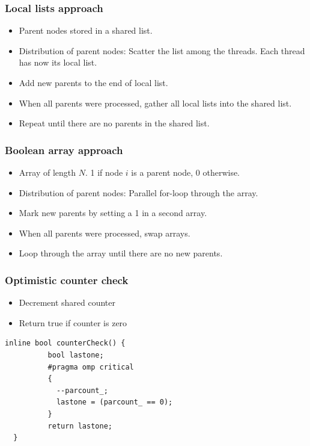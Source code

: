 \begin{frame}
 \frametitle{Local lists approach}
  \begin{itemize}
  \item Parent nodes stored in a shared list.
  \item Distribution of parent nodes: Scatter the list among the threads. Each thread has now its local list.
  \item Add new parents to the end of local list.
  \item When all parents were processed, gather all local lists into the shared list.
  \item Repeat until there are no parents in the shared list.
  \end{itemize}
\end{frame}

\begin{frame}
 \frametitle{Boolean array approach}
 \begin{itemize}
  \item Array of length $N$. 1 if node $i$ is a parent node, 0 otherwise.
  \item Distribution of parent nodes: Parallel for-loop through the array.
  \item Mark new parents by setting a 1 in a second array.
  \item When all parents were processed, swap arrays.
  \item Loop through the array until there are no new parents.
 \end{itemize}
\end{frame}

\begin{frame}[fragile]
 \frametitle{Optimistic counter check}
 \begin{itemize}
  \item Decrement shared counter
  \item Return true if counter is zero
 \end{itemize}
 \begin{lstlisting}[style=cpp]
  inline bool counterCheck() {
          bool lastone;
          #pragma omp critical
          {
            --parcount_;
            lastone = (parcount_ == 0);
          }
          return lastone;
  }
 \end{lstlisting}
\end{frame}

